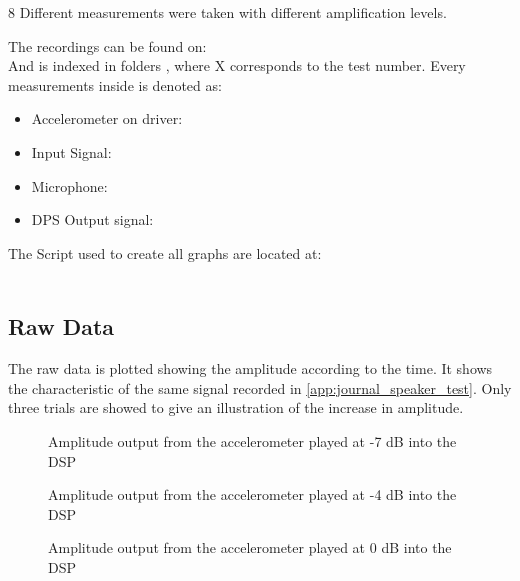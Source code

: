 8 Different measurements were taken with different amplification levels.

The recordings can be found on:\\
And is indexed in folders , where X corresponds to the test number. Every measurements inside is denoted as:
\begin{itemize}
\item Accelerometer on driver: 
\item Input Signal: 
\item Microphone: 
\item DPS Output signal: 
\end{itemize}
\vspace*{-5mm}
The Script used to create all graphs are located at:\\
\\

\subsection{Raw Data}
The raw data is plotted showing the amplitude according to the time. It shows the characteristic of the same signal recorded in \autoref{app:journal_speaker_test}. Only three trials are showed to give an illustration of the increase in amplitude.
\begin{figure}[H]
	\centering
	
	\caption{Amplitude output from the accelerometer played at -7 dB into the DSP}
	\label{fig:Driver2Test}
\end{figure}

\begin{figure}[H]
	\centering
	
	\caption{Amplitude output from the accelerometer played at -4 dB into the DSP}
	\label{fig:Driver5Test}
\end{figure}


\begin{figure}[H]
	\centering
	
	\caption{Amplitude output from the accelerometer played at 0 dB into the DSP}
	\label{fig:Driver10TestAcc}
\end{figure}


